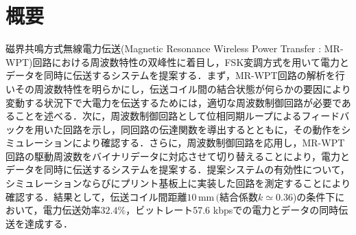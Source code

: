 \chapter*{概要}
磁界共鳴方式無線電力伝送(Magnetic Resonance Wireless Power Transfer : MR-WPT)回路における周波数特性の双峰性に着目し，FSK変調方式を用いて電力とデータを同時に伝送するシステムを提案する．まず，MR-WPT回路の解析を行いその周波数特性を明らかにし，伝送コイル間の結合状態が何らかの要因により変動する状況下で大電力を伝送するためには，適切な周波数制御回路が必要であることを述べる．次に，周波数制御回路として位相同期ループによるフィードバックを用いた回路を示し，同回路の伝達関数を導出するとともに，その動作をシミュレーションにより確認する．さらに，周波数制御回路を応用し，MR-WPT回路の駆動周波数をバイナリデータに対応させて切り替えることにより，電力とデータを同時に伝送するシステムを提案する．提案システムの有効性について，シミュレーションならびにプリント基板上に実装した回路を測定することにより確認する．結果として，伝送コイル間距離$10 \, \mathrm{mm} \, (\mbox{結合係数}k \simeq 0.36$)の条件下において，電力伝送効率$32.4 \%$，ビットレート57.6 kbpsでの電力とデータの同時伝送を達成する．
